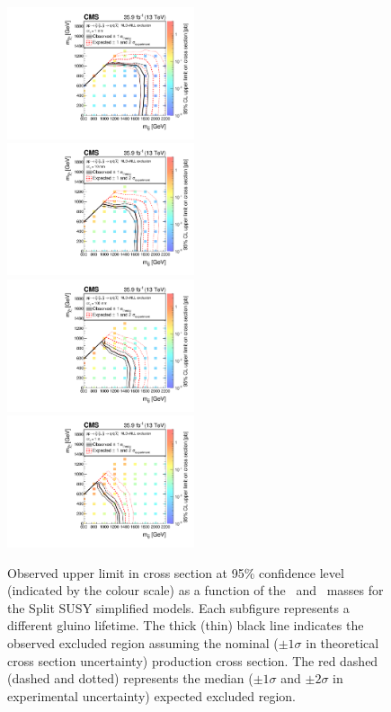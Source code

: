 \begin{figure}[!t]
\centering
\includegraphics[width=0.49\textwidth]{figs/results/T1qqqqLL1XSEC}~
\includegraphics[width=0.49\textwidth]{figs/results/T1qqqqLL10XSEC}\\
\includegraphics[width=0.49\textwidth]{figs/results/T1qqqqLL100XSEC}~
\includegraphics[width=0.49\textwidth]{figs/results/T1qqqqLL1000XSEC}
\caption{Observed upper limit in cross section at 95\% confidence level 
(indicated by the colour scale) as a function of the \gluino~and 
\neutralino~masses for the Split SUSY simplified models. Each subfigure 
represents a different gluino lifetime. The thick (thin) black line indicates 
the observed excluded region assuming the nominal ($\pm1\sigma$ in theoretical 
cross section uncertainty) production cross section. The red dashed (dashed and 
dotted) represents the median ($\pm1\sigma$ and $\pm2\sigma$ in experimental 
uncertainty) expected excluded region.}
\label{fig:limits-individual-2}
\end{figure}
